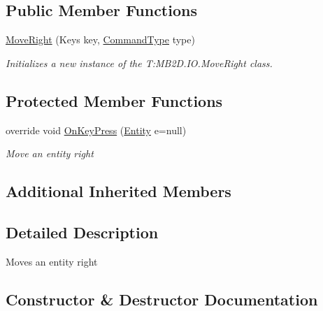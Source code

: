\subsection*{Public Member Functions}
\begin{DoxyCompactItemize}
\item 
\hyperlink{class_m_b2_d_1_1_i_o_1_1_move_right_a95c80b11d5db82f6c5dbed17883cfa7e}{Move\+Right} (Keys key, \hyperlink{namespace_m_b2_d_1_1_i_o_ab5f95f3fe9e652778b62bdf943168a68}{Command\+Type} type)
\begin{DoxyCompactList}\small\item\em Initializes a new instance of the T\+:\+M\+B2\+D.\+I\+O.\+Move\+Right class. \end{DoxyCompactList}\end{DoxyCompactItemize}
\subsection*{Protected Member Functions}
\begin{DoxyCompactItemize}
\item 
override void \hyperlink{class_m_b2_d_1_1_i_o_1_1_move_right_aa0d9913727d27d01dff4fdd394e2f6f4}{On\+Key\+Press} (\hyperlink{class_m_b2_d_1_1_entity_component_1_1_entity}{Entity} e=null)
\begin{DoxyCompactList}\small\item\em Move an entity right \end{DoxyCompactList}\end{DoxyCompactItemize}
\subsection*{Additional Inherited Members}


\subsection{Detailed Description}
Moves an entity right 



\subsection{Constructor \& Destructor Documentation}
\hypertarget{class_m_b2_d_1_1_i_o_1_1_move_right_a95c80b11d5db82f6c5dbed17883cfa7e}{}\label{class_m_b2_d_1_1_i_o_1_1_move_right_a95c80b11d5db82f6c5dbed17883cfa7e} 
